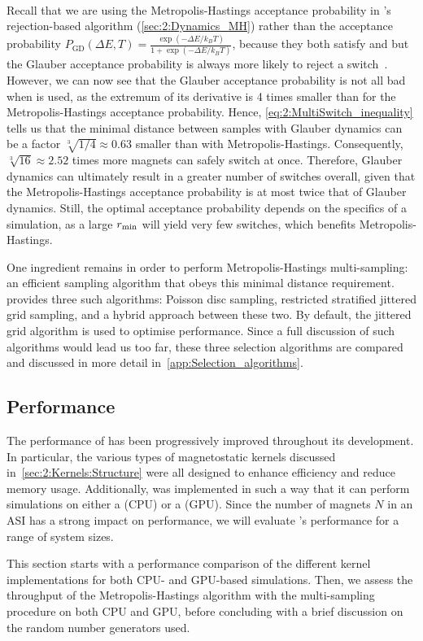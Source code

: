 \\\par
Recall that we are using the Metropolis-Hastings acceptance probability in \hotspice's rejection-based  algorithm (\cref{sec:2:Dynamics_MH}) rather than the  acceptance probability $P_\mathrm{GD}(\Delta E, T) = \frac{\exp(-\Delta E/k_B T)}{1+\exp(-\Delta E/k_B T)}$, because they both satisfy  and  but the Glauber acceptance probability is always more likely to reject a switch~\cite{bit-player_MCvsGlauber}.
However, we can now see that the Glauber acceptance probability is not all bad when  is used, as the extremum of its derivative is 4 times smaller than for the Metropolis-Hastings acceptance probability.
Hence, \cref{eq:2:MultiSwitch_inequality} tells us that the minimal distance between samples with Glauber dynamics can be a factor $\sqrt[3]{1/4} \approx 0.63$ smaller than with Metropolis-Hastings.
Consequently, $\sqrt[3]{16} \approx 2.52$ times more magnets can safely switch at once.
Therefore, Glauber dynamics can ultimately result in a greater number of switches overall, given that the Metropolis-Hastings acceptance probability is at most twice that of Glauber dynamics. Still, the optimal acceptance probability depends on the specifics of a simulation, as a large $r_\mathrm{min}$ will yield very few switches, which benefits Metropolis-Hastings. \par
One ingredient remains in order to perform Metropolis-Hastings multi-sampling: an efficient sampling algorithm that obeys this minimal distance requirement.
\hotspice provides three such algorithms: Poisson disc sampling, restricted stratified jittered grid sampling, and a hybrid approach between these two.
By default, the jittered grid algorithm is used to optimise performance.
Since a full discussion of such algorithms would lead us too far, these three selection algorithms are compared and discussed in more detail in~\cref{app:Selection_algorithms}.

\subsection{Performance}\label{sec:2:Implementation:Performance}
The performance of \hotspice has been progressively improved throughout its development.
In particular, the various types of magnetostatic kernels discussed in~\cref{sec:2:Kernels:Structure} were all designed to enhance efficiency and reduce memory usage.
Additionally, \hotspice was implemented in such a way that it can perform simulations on either a  (CPU) or a  (GPU).
Since the number of magnets $N$ in an ASI has a strong impact on performance, we will evaluate \hotspice's performance for a range of system sizes. \par
This section starts with a performance comparison of the different kernel implementations for both CPU- and GPU-based simulations.
Then, we assess the throughput of the Metropolis-Hastings algorithm with the multi-sampling procedure on both CPU and GPU, before concluding with a brief discussion on the random number generators used.

